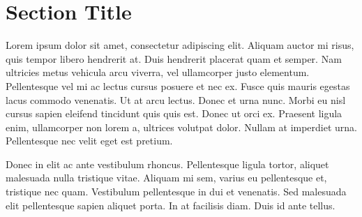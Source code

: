 \documentclass[
	a4paper, %
	12pt, %
]{CSSullivanBusinessReport}
\begin{document}
\newpage


\begin{twothirdswidth} %
	\tableofcontents %
\end{twothirdswidth}

\newpage


\section{Section Title} %

Lorem ipsum dolor sit amet, consectetur adipiscing elit. Aliquam auctor mi risus, quis tempor libero hendrerit at. Duis hendrerit placerat quam et semper. Nam ultricies metus vehicula arcu viverra, vel ullamcorper justo elementum. Pellentesque vel mi ac lectus cursus posuere et nec ex. Fusce quis mauris egestas lacus commodo venenatis. Ut at arcu lectus. Donec et urna nunc. Morbi eu nisl cursus sapien eleifend tincidunt quis quis est. Donec ut orci ex. Praesent ligula enim, ullamcorper non lorem a, ultrices volutpat dolor. Nullam at imperdiet urna. Pellentesque nec velit eget est pretium.

Donec in elit ac ante vestibulum rhoncus. Pellentesque ligula tortor, aliquet malesuada nulla tristique vitae. Aliquam mi sem, varius eu pellentesque et, tristique nec quam. Vestibulum pellentesque in dui et venenatis. Sed malesuada elit pellentesque sapien aliquet porta. In at facilisis diam. Duis id ante tellus. %
\end{document}
